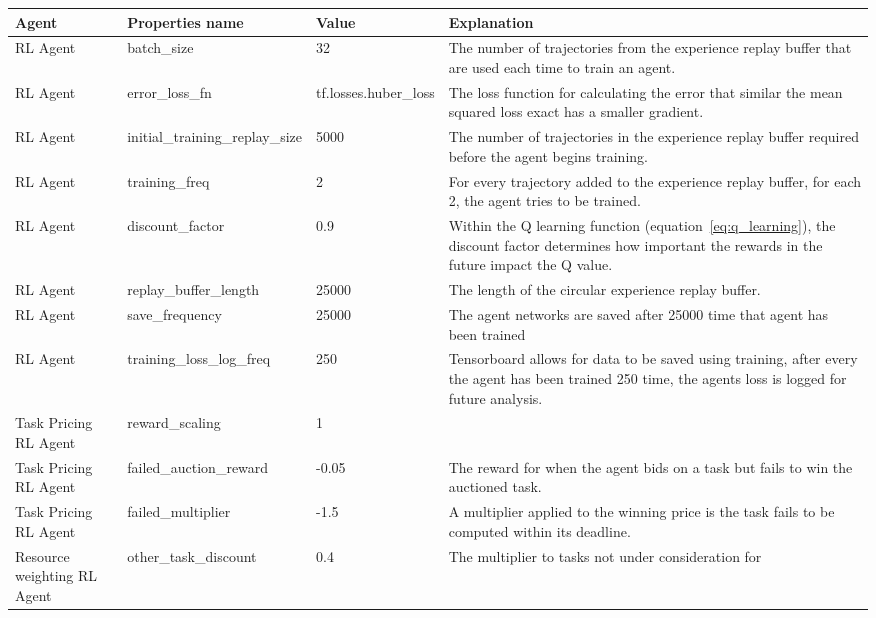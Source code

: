 \begin{longtable}{|p{2.5cm}|p{3cm}|p{3cm}|p{4cm}|} \hline
    \textbf{Agent} & \textbf{Properties name} & \textbf{Value} & \textbf{Explanation} \\ \hline
        RL Agent & batch\_size & 32 & The number of trajectories from the experience replay buffer that are used each
            time to train an agent. \\ \hline
        RL Agent & error\_loss\_fn & tf.losses.huber\_loss & The loss function for calculating the error that similar
            the mean squared loss exact has a smaller gradient. \\ \hline
        RL Agent & initial\_training\_replay\_size & 5000 & The number of trajectories in the experience replay buffer
            required before the agent begins training. \\ \hline
        RL Agent & training\_freq & 2 & For every trajectory added to the experience replay buffer, for each 2, the
            agent tries to be trained. \\ \hline
        RL Agent & discount\_factor & 0.9 & Within the Q learning function (equation~\eqref{eq:q_learning}), the
            discount factor determines how important the rewards in the future impact the Q value. \\ \hline
        RL Agent & replay\_buffer\_length & 25000 & The length of the circular experience replay buffer. \\ \hline
        RL Agent & save\_frequency & 25000 & The agent networks are saved after 25000 time that agent has been trained
            \\ \hline
        RL Agent & training\_loss\_log\_freq & 250 & Tensorboard allows for data to be saved using training, after every
            the agent has been trained 250 time, the agents loss is logged for future analysis. \\ \hline
        Task Pricing RL Agent & reward\_scaling & 1 & \\ \hline
        Task Pricing RL Agent & failed\_auction\_reward & -0.05 & The reward for when the agent bids on a task but fails
            to win the auctioned task. \\ \hline
        Task Pricing RL Agent & failed\_multiplier & -1.5 & A multiplier applied to the winning price is the task fails
            to be computed within its deadline. \\ \hline
        Resource weighting RL Agent & other\_task\_discount & 0.4 & The multiplier to tasks not under consideration for

\end{longtable}
